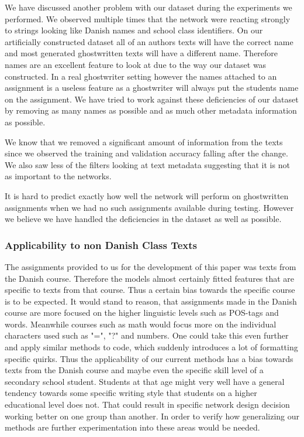 We have discussed another problem with our dataset during the experiments we
performed. We observed multiple times that the network were reacting strongly
to strings looking like Danish names and school class identifiers. On our
artificially constructed dataset all of an authors texts will have the correct
name and most generated ghostwritten texts will have a different name.
Therefore names are an excellent feature to look at due to the way our dataset
was constructed. In a real ghostwriter setting however the names attached to an
assignment is a useless feature as a ghostwriter will always put the students
name on the assignment. We have tried to work against these deficiencies of
our dataset by removing as many names as possible and as much other metadata
information as possible.

We know that we removed a significant amount of information from the texts since
we observed the training and validation accuracy falling after the change. We
also saw less of the filters looking at text metadata suggesting that it is not
as important to the networks.

It is hard to predict exactly how well the network will perform on ghostwritten
assignments when we had no such assignments available during testing. However we
believe we have handled the deficiencies in the dataset as well as possible.


\subsubsection{Applicability to non Danish Class Texts}

The assignments provided to us for the development of this paper was texts
from the Danish course. Therefore the models almost certainly fitted features
that are specific to texts from that course. Thus a certain bias towards the
specific course is to be expected. It would stand to reason, that assignments
made in the Danish course are more focused on the higher linguistic levels such
as \gls{POS}-tags and words. Meanwhile courses such as math would focus more on
the individual characters used such as "=", "?" and numbers. One could take this
even further and apply similar methods to code, which suddenly introduces a lot
of formatting specific quirks. Thus the applicability of our current methods
has a bias towards texts from the Danish course and maybe even the specific
skill level of a secondary school student. Students at that age might very
well have a general tendency towards some specific writing style that students
on a higher educational level does not. That could result in specific network
design decision working better on one group than another. In order to verify how
generalizing our methods are further experimentation into these areas would be
needed.

